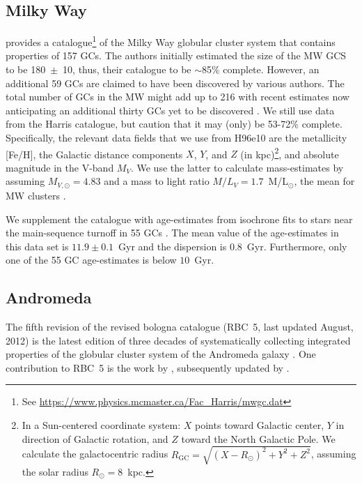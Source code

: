 \documentclass[a4paper,fleqn,usenatbib]{mnras}
\begin{document}
\subsection{Milky Way}
\label{sec:milkyway}
\citet[][2010 edition; hereafter H96e10]{1996AJ....112.1487H} provides a
catalogue\footnote{See \url{https://www.physics.mcmaster.ca/Fac_Harris/mwgc.dat}}
of the Milky Way globular cluster system that contains properties of
157 GCs. The authors initially estimated the size of the MW GCS to be 180~$\pm$~10,
thus, their catalogue to be $\sim$85\% complete. However, an additional 59 GCs
are claimed to have been discovered by various authors. The total number of GCs
in the MW might add up to 216 with recent estimates now anticipating an additional 
thirty GCs yet to be discovered \citep[e.g.][and references therein]{2018ApJ...863L..38R}.
We still use data from the Harris catalogue, but caution that it may (only) be
53-72\% complete. Specifically, the relevant data fields that we use from H96e10
are the metallicity [Fe/H], the Galactic distance components $X$, $Y$, and $Z$ (in
kpc)\footnote{In a Sun-centered coordinate system: $X$ points toward Galactic
center, $Y$ in direction of Galactic rotation, and $Z$ toward the North Galactic
Pole. We calculate the galactocentric radius $R_{\text{GC}}=\sqrt{(X-R_\odot)^2
+ Y^2 + Z^2}$, assuming the solar radius $R_\odot=8$~kpc.}, and absolute
magnitude in the V-band $M_V$. We use the latter to calculate mass-estimates by
assuming $M_{V,\odot}=4.83$ and a mass to light ratio $M/L_V = 1.7$~M/L$_{\odot}$,
the mean for MW clusters \citep{2005ApJS..161..304M}.


We supplement the catalogue with age-estimates from isochrone fits to stars
near the main-sequence turnoff in 55 GCs \citep[][hereafter V13]{2013ApJ...775..134V}.
The mean value of the age-estimates in this data set is $11.9 \pm 0.1$~Gyr and
the dispersion is $0.8$~Gyr. Furthermore, only one of the 55 GC age-estimates is
below $10$~Gyr.

\subsection{Andromeda}
\label{sec:andromeda}
The fifth revision of the revised bologna catalogue (RBC~5, last updated
August, 2012) is the latest edition of three decades of systematically
collecting integrated properties of the globular cluster system of the
Andromeda galaxy \citep[][and references therein]{2004A&A...416..917G}. One
contribution to RBC~5 is the work by \citet[][hereafter C11]{2011AJ....141...61C},
subsequently updated by \citet[][hereafter CR16]{2016ApJ...824...42C}.
\end{document}
